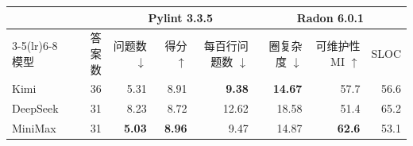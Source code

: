 \begin{tabular}{@{}lrrrrrrr@{}}
\toprule
 & & \multicolumn{3}{c}{Pylint 3.3.5} & \multicolumn{3}{c}{Radon 6.0.1} \\
\cmidrule(lr){3-5}\cmidrule(lr){6-8}
模型 & 答案数 & 问题数 $\downarrow$ & 得分 $\uparrow$ & 每百行问题数 $\downarrow$ & 圈复杂度 $\downarrow$ & 可维护性 MI $\uparrow$ & SLOC \\
\midrule
Kimi & 36 & 5.31 & 8.91 & \textbf{9.38} & \textbf{14.67} & 57.7 & 56.6 \\
DeepSeek & 31 & 8.23 & 8.72 & 12.62 & 18.58 & 51.4 & 65.2 \\
MiniMax & 31 & \textbf{5.03} & \textbf{8.96} & 9.47 & 14.87 & \textbf{62.6} & 53.1 \\
\bottomrule
\end{tabular}
